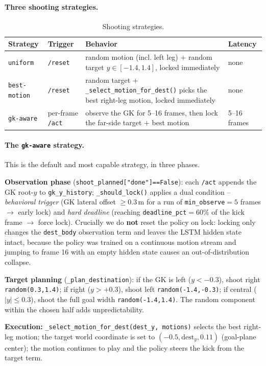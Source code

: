 \documentclass{article}
\newcommand{\code}[1]{\texttt{#1}}
\begin{document}
\paragraph{Three shooting strategies.}
\begin{table}[h]
\centering\small
\caption{Shooting strategies.}
\begin{tabular}{@{}llp{6.4cm}l@{}}
\toprule
Strategy & Trigger & Behavior & Latency \\
\midrule
\code{uniform} & \code{/reset} & random motion (incl. left leg) $+$ random target $y\in[-1.4,1.4]$, locked immediately & none \\
\code{best-motion} & \code{/reset} & random target $+$ \code{_select_motion_for_dest()} picks the best right-leg motion, locked immediately & none \\
\code{gk-aware} & per-frame \code{/act} & observe the GK for 5--16 frames, then lock the far-side target $+$ best motion & 5--16 frames \\
\bottomrule
\end{tabular}
\end{table}

\paragraph{The \code{gk-aware} strategy.}
This is the default and most capable strategy, in three phases.

\textbf{Observation phase} (\code{shoot_planned["done"]==False}): each \code{/act}
appends the GK root-$y$ to \code{gk_y_history}; \code{_should_lock()} applies a
dual condition -- \emph{behavioral trigger} (GK lateral offset $\geq0.3$\,m for a
run of \code{min_observe}$=5$ frames $\to$ early lock) and \emph{hard deadline}
(reaching \code{deadline_pct}$=60\%$ of the kick frame $\to$ force lock).
Crucially we do \textbf{not} reset the policy on lock: locking only changes the
\code{dest_body} observation term and leaves the LSTM hidden state intact, because
the policy was trained on a continuous motion stream and jumping to frame 16 with
an empty hidden state causes an out-of-distribution collapse.

\textbf{Target planning} (\code{_plan_destination}): if the GK is left
($y<-0.3$), shoot right \code{random(0.3,1.4)}; if right ($y>+0.3$), shoot left
\code{random(-1.4,-0.3)}; if central ($|y|\leq0.3$), shoot the full goal width
\code{random(-1.4,1.4)}. The random component within the chosen half adds
unpredictability.

\textbf{Execution:} \code{_select_motion_for_dest(dest_y, motions)} selects the
best right-leg motion; the target world coordinate is set to $(-0.5,\text{dest}_y,
0.11)$ (goal-plane center); the motion continues to play and the policy steers the
kick from the target term.
\end{document}
